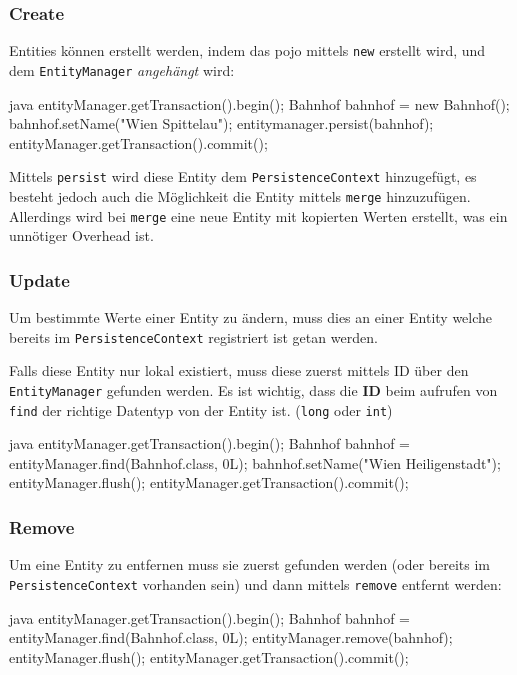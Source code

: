 \subsubsection{Create}

Entities können erstellt werden, indem das \gls{pojo} mittels \texttt{new} erstellt wird, und dem \texttt{EntityManager} \textit{angehängt} wird:

\begin{code}{java}
entityManager.getTransaction().begin();
Bahnhof bahnhof = new Bahnhof();
bahnhof.setName("Wien Spittelau");
entitymanager.persist(bahnhof);
entityManager.getTransaction().commit();
\end{code}

Mittels \texttt{persist} wird diese Entity dem \texttt{PersistenceContext} hinzugefügt, es besteht jedoch auch die Möglichkeit die Entity mittels \texttt{merge} hinzuzufügen. Allerdings wird bei \texttt{merge} eine neue Entity mit kopierten Werten erstellt, was ein unnötiger Overhead ist.

\subsubsection{Update}

Um bestimmte Werte einer Entity zu ändern, muss dies an einer Entity welche bereits im \texttt{PersistenceContext} registriert ist getan werden.

Falls diese Entity nur lokal existiert, muss diese zuerst mittels ID über den \texttt{EntityManager} gefunden werden. Es ist wichtig, dass die \textbf{ID} beim aufrufen von \texttt{find} der richtige Datentyp von der Entity ist. (\texttt{long} oder \texttt{int})

\begin{code}{java}
entityManager.getTransaction().begin();
Bahnhof bahnhof = entityManager.find(Bahnhof.class, 0L);
bahnhof.setName("Wien Heiligenstadt");
entityManager.flush();
entityManager.getTransaction().commit();
\end{code}

\subsubsection{Remove}

Um eine Entity zu entfernen muss sie zuerst gefunden werden (oder bereits im \texttt{PersistenceContext} vorhanden sein) und dann mittels \texttt{remove} entfernt werden:

\begin{code}{java}
entityManager.getTransaction().begin();
Bahnhof bahnhof = entityManager.find(Bahnhof.class, 0L);
entityManager.remove(bahnhof);
entityManager.flush();
entityManager.getTransaction().commit();
\end{code}


